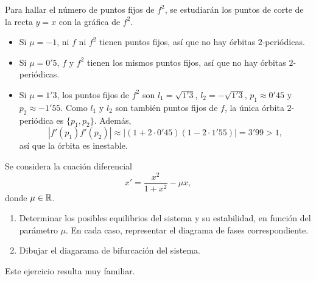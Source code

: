 \documentclass[11pt]{report}
\begin{document}
\begin{solution}
\begin{enumerate}
        Para hallar el número de puntos fijos de $f^2$, se estudiarán los puntos de corte de la recta $y = x$ con la gráfica de $f^2$.
        \begin{itemize}
            \item Si $\mu = -1$, ni $f$ ni $f^2$ tienen puntos fijos, así que no hay órbitas $2$-periódicas.
            \item Si $\mu = 0'5$, $f$ y $f^2$ tienen los mismos puntos fijos, así que no hay órbitas $2$-periódicas.
            \item Si $\mu = 1'3$, los puntos fijos de $f^2$ son $l_1 = \sqrt{1'3}$, $l_2 = -\sqrt{1'3}$, $p_1  \approx 0'45$ y $p_2 \approx -1'55$. Como $l_1$ y $l_2$ son también puntos fijos de $f$, la única órbita $2$-periódica es $\{p_1,p_2\}$. Además,
            \[|f'(p_1)f'(p_2)| \approx |(1+2\cdot 0'45)(1-2\cdot 1'55)| = 3'99 > 1,\]
            así que la órbita es inestable.
        \end{itemize}
    \end{enumerate}
\end{solution}

\begin{exercise}[Junio de 2024]
    Se considera la cuación diferencial
    \[x' = \frac{x^2}{1+x^2}-\mu x,\]
    donde $\mu\in\mathbb R$.
    \begin{enumerate}
        \item Determinar los posibles equilibrios del sistema y su estabilidad, en función del parámetro $\mu$. En cada caso, representar el diagrama de fases correspondiente.
        \item Dibujar el diagarama de bifurcación del sistema.
    \end{enumerate}
\end{exercise}

\begin{solution}
    Este ejercicio resulta muy familiar.
\end{solution}
\end{document}
